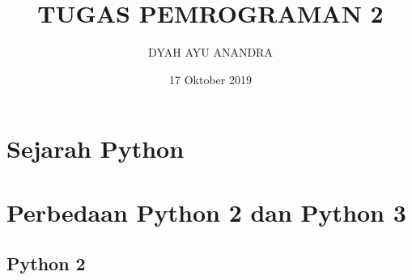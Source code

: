 \documentclass{article}
\title{TUGAS PEMROGRAMAN 2}
\author{DYAH AYU ANANDRA}
\date{17 Oktober 2019}
\begin{document}
\maketitle

\section{Sejarah Python}
\usepackage{Python merupakan bahasa pemrograman yang tingkatannya paling tinggi. Untuk membuat banyak program seperti, program CLI, program GUI (dekstop), Aplikasi Mobile, Web, IoT, Game dan lain-lain. Pemrograman Bahasa python merupakan pemrograman gratis atau freeware, sehingga dapat dikembangkan, dan tidak ada batasan tertentu dalam penyalinannya dan pendistribusiannya. Terdapat pelayanan yang disediakan lengkap dengan source codenya, debugger dan profiler, interface, fungsi system, Gui dan basisdatanya. Python tersedia untuk berbagai Sistem Operasi, Seperti Unix (Linux), PCs (DOS, Windows, OS/2), Machintosh dan sebagainnya.Python disempurnakan oleh Guido Van Rossum tahun 1990 di CWI, Amsterdam menjadi kelanjutan dari bahsa pemrograman ABC. Versi terakhir yang dikeluarkan oleh CWI adalah 1.2. Tahun 1995, Guido berpindah ke CNRI dengan terus mengembangkan Python. Versi terakhir yang dikeluarkan adalah 1.6. tahun 2000, Guido dan pengembang inti Python berpindah ke BeOpen.com yang melahirkan sebuah perusahaan komersial dan membentuk BeOpen PythonLabs.}

\section{Perbedaan Python 2 dan Python 3}
\subsection{Python 2}
\usepackage{Python versi 2.0 dikeluarkan oleh BeOpen. Setelah mengeluarkan Python versi 2.0, Guido dan anggota tim PythonLabs pindah ke DigitalCreations. Saat ini pengembangan Python terus saja dilakukan oleh para sekumpulan pemrogram yang dikoordinir oleh Guido dan Python Perangkat Lunak Foundation. Python Perangkat Lunak Foundation merupakan lembaga  non-profit dibentuk sebagai pemegang hak cipta dari intelektual Python mulai dari versi 2.1 demikianlah mencegah Python dimiliki oleh perusahaan komersial. Saat ini pendistribusian Python telah mencapai versi 2.6.1. Python Versi 2  merupakan versi yang banyak sekali digunakan saat ini, seperti dilingkungan produksi dan pengembangan. Untuk membuka python versi 2 hanya dengan menggunkan perintah python saja.}
\end{document}
